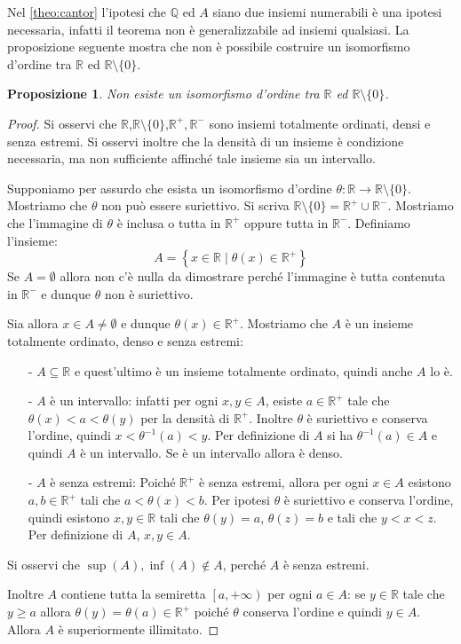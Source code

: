 \documentclass[12pt,a4paper,openright]{report}
\newcommand{\Q}{\mathbb{Q}} %
\newcommand{\R}{\mathbb{R}} %
\newcommand{\0}{\setminus\{0\}} %
\theoremstyle{definition}
\theoremstyle{plain}
\newtheorem{prop}[defn]{Proposizione}
\begin{document}
Nel \cref{theo:cantor} l'ipotesi che $\Q$ ed $A$ siano due insiemi numerabili è una ipotesi necessaria, infatti il teorema non è generalizzabile ad insiemi qualsiasi. La proposizione seguente mostra che non è possibile costruire un isomorfismo d'ordine tra $\R$ ed $\R\0$.
\begin{prop}
Non esiste un isomorfismo d'ordine tra $\R$ ed $\R\0$.
\end{prop}
\begin{proof}
    Si osservi che $\R$,$\R\0$,$\R^+,\R^-$ sono insiemi totalmente ordinati, densi e senza estremi. Si osservi inoltre che la densità di un insieme è condizione necessaria, ma non sufficiente affinché tale insieme sia un intervallo.

	\noindent Supponiamo per assurdo che esista un isomorfismo d'ordine $\theta: \R \rightarrow \R\0$. Mostriamo che $\theta$ non può essere suriettivo.
	Si scriva $\R\0=\R^+\cup\R^-$. Mostriamo che l'immagine di $\theta$ è inclusa o tutta in $\R^+$ oppure tutta in $\R^-$.
    Definiamo l'insieme:
    \[A=\left\{x \in \R \mid \theta(x) \in \R^+ \right\}\]
    Se $A=\emptyset$ allora non c'è nulla da dimostrare perché l'immagine è tutta contenuta in $\R^-$ e dunque $\theta$ non è suriettivo.
    
    Sia allora $x \in A\neq\emptyset$ e dunque $\theta(x) \in \R^+$. Mostriamo che $A$ è un insieme totalmente ordinato, denso e senza estremi:
    \begin{itemize}
    \item[-] $A\subseteq \R$ e quest'ultimo è un insieme totalmente ordinato, quindi anche $A$ lo è.
    \item[-] $A$ è un intervallo: infatti per ogni $x,y \in A$, esiste $a \in \R^+$ tale che $\theta(x)<a<\theta(y)$ per la densità di $\R^+$. Inoltre $\theta$ è suriettivo e conserva l'ordine, quindi $x< \theta^{-1}(a)<y$. Per definizione di $A$ si ha $\theta^{-1}(a) \in A$ e quindi $A$ è un intervallo. Se è un intervallo allora è denso.
    \item[-] $A$ è senza estremi: Poiché $\R^+$ è senza estremi, allora per ogni $x \in A$ esistono $a,b \in \R^+$ tali che $a<\theta(x)<b$. Per ipotesi $\theta$ è suriettivo e conserva l'ordine, quindi esistono $x,y \in \R$ tali che $\theta(y)=a$, $\theta(z)=b$ e tali che $y<x<z$. Per definizione di $A$, $x,y \in A$.
    \end{itemize}
    Si osservi che $\sup(A),\inf(A)\notin A$, perché $A$ è senza estremi.

    Inoltre $A$ contiene tutta la semiretta $\left[a,+\infty\right)$ per ogni $a \in A$: se $y \in \R$ tale che $y \geq a$ allora $\theta(y)=\theta(a) \in \R^+$ poiché $\theta$ conserva l'ordine e quindi $y \in A$. Allora $A$ è superiormente illimitato.


\end{proof}
\end{document}
